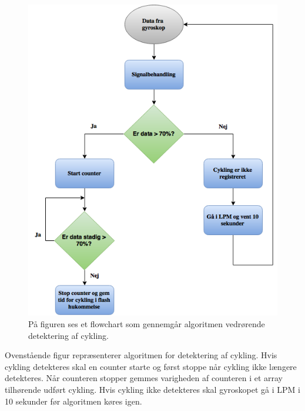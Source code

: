 \begin{figure}[H]
	\centering
	\includegraphics[scale=0.6]{figures/cDesign/algoritme_cykling.png}
	\caption{På figuren ses et flowchart som gennemgår algoritmen vedrørende detektering af cykling.}
	\label{fig:algoritme_cykling}
\end{figure}

Ovenstående figur repræsenterer algoritmen for detektering af cykling. Hvis cykling detekteres skal en counter starte og først stoppe når cykling ikke længere detekteres. Når counteren stopper gemmes varigheden af counteren i et array tilhørende udført cykling. Hvis cykling ikke detekteres skal gyroskopet gå i LPM i 10 sekunder før algoritmen køres igen. 

